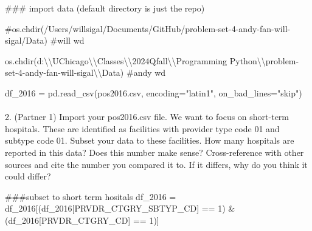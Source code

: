 \documentclass[
  letterpaper,
  DIV=11,
  numbers=noendperiod]{scrartcl}
\makeatletter
\let\oldparagraph\paragraph
\renewcommand{\paragraph}{
    \@ifstar
      \xxxParagraphStar
      \xxxParagraphNoStar
  }
\newcommand{\xxxParagraphStar}[1]{\oldparagraph*{#1}\mbox{}}
\newcommand{\xxxParagraphNoStar}[1]{\oldparagraph{#1}\mbox{}}
\newenvironment{Shaded}{\begin{snugshade}}{\end{snugshade}}
\newcommand{\CharTok}[1]{\textcolor[rgb]{0.13,0.47,0.30}{#1}}
\newcommand{\CommentTok}[1]{\textcolor[rgb]{0.37,0.37,0.37}{#1}}
\newcommand{\DecValTok}[1]{\textcolor[rgb]{0.68,0.00,0.00}{#1}}
\newcommand{\NormalTok}[1]{\textcolor[rgb]{0.00,0.23,0.31}{#1}}
\newcommand{\OperatorTok}[1]{\textcolor[rgb]{0.37,0.37,0.37}{#1}}
\newcommand{\StringTok}[1]{\textcolor[rgb]{0.13,0.47,0.30}{#1}}
\makeatother
\begin{document}
\begin{Shaded}
\begin{Highlighting}[]
\CommentTok{\#\#\# import data (default directory is just the repo)}

\CommentTok{\#os.chdir(\textquotesingle{}/Users/willsigal/Documents/GitHub/problem{-}set{-}4{-}andy{-}fan{-}will{-}sigal/Data\textquotesingle{}) \#will wd}

\NormalTok{os.chdir(}\StringTok{\textquotesingle{}d:}\CharTok{\textbackslash{}\textbackslash{}}\StringTok{UChicago}\CharTok{\textbackslash{}\textbackslash{}}\StringTok{Classes}\CharTok{\textbackslash{}\textbackslash{}}\StringTok{2024Qfall}\CharTok{\textbackslash{}\textbackslash{}}\StringTok{Programming Python}\CharTok{\textbackslash{}\textbackslash{}}\StringTok{problem{-}set{-}4{-}andy{-}fan{-}will{-}sigal}\CharTok{\textbackslash{}\textbackslash{}}\StringTok{Data\textquotesingle{}}\NormalTok{) }\CommentTok{\#andy wd}

\NormalTok{df\_2016 }\OperatorTok{=}\NormalTok{ pd.read\_csv(}\StringTok{\textquotesingle{}pos2016.csv\textquotesingle{}}\NormalTok{, encoding}\OperatorTok{=}\StringTok{"latin1"}\NormalTok{, on\_bad\_lines}\OperatorTok{=}\StringTok{"skip"}\NormalTok{)}
\end{Highlighting}
\end{Shaded}

\paragraph{2. (Partner 1) Import your pos2016.csv file. We want to focus
on short-term hospitals. These are identified as facilities with
provider type code 01 and subtype code 01. Subset your data to these
facilities. How many hospitals are reported in this data? Does this
number make sense? Cross-reference with other sources and cite the
number you compared it to. If it differs, why do you think it could
differ?}\label{partner-1-import-your-pos2016.csv-file.-we-want-to-focus-on-short-term-hospitals.-these-are-identified-as-facilities-with-provider-type-code-01-and-subtype-code-01.-subset-your-data-to-these-facilities.-how-many-hospitals-are-reported-in-this-data-does-this-number-make-sense-cross-reference-with-other-sources-and-cite-the-number-you-compared-it-to.-if-it-differs-why-do-you-think-it-could-differ}

\begin{Shaded}
\begin{Highlighting}[]
\CommentTok{\#\#\#subset to short term hositals}
\NormalTok{df\_2016 }\OperatorTok{=}\NormalTok{ df\_2016[(df\_2016[}\StringTok{\textquotesingle{}PRVDR\_CTGRY\_SBTYP\_CD\textquotesingle{}}\NormalTok{] }\OperatorTok{==} \DecValTok{1}\NormalTok{) }\OperatorTok{\&}\NormalTok{ (df\_2016[}\StringTok{\textquotesingle{}PRVDR\_CTGRY\_CD\textquotesingle{}}\NormalTok{] }\OperatorTok{==} \DecValTok{1}\NormalTok{)]}
\end{Highlighting}
\end{Shaded}
\end{document}
